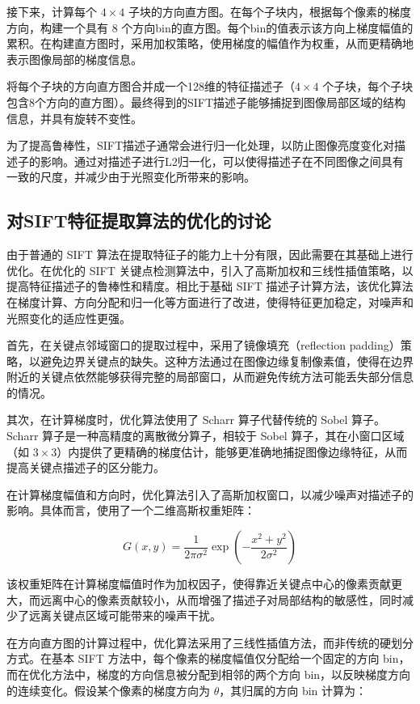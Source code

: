 \documentclass[a4paper, utf8]{ctexart}
\begin{document}
	接下来，计算每个 $4 \times 4$ 子块的方向直方图。在每个子块内，根据每个像素的梯度方向，构建一个具有 $8$ 个方向bin的直方图。每个bin的值表示该方向上梯度幅值的累积。在构建直方图时，采用加权策略，使用梯度的幅值作为权重，从而更精确地表示图像局部的梯度信息。
	
	将每个子块的方向直方图合并成一个128维的特征描述子（$4 \times 4$ 个子块，每个子块包含8个方向的直方图）。最终得到的SIFT描述子能够捕捉到图像局部区域的结构信息，并具有旋转不变性。
	
	为了提高鲁棒性，SIFT描述子通常会进行归一化处理，以防止图像亮度变化对描述子的影响。通过对描述子进行L2归一化，可以使得描述子在不同图像之间具有一致的尺度，并减少由于光照变化所带来的影响。
	
	\subsection{对SIFT特征提取算法的优化的讨论}
	
	由于普通的 SIFT 算法在提取特征子的能力上十分有限，因此需要在其基础上进行优化。在优化的 SIFT 关键点检测算法中，引入了高斯加权和三线性插值策略，以提高特征描述子的鲁棒性和精度。相比于基础 SIFT 描述子计算方法，该优化算法在梯度计算、方向分配和归一化等方面进行了改进，使得特征更加稳定，对噪声和光照变化的适应性更强。
	
	首先，在关键点邻域窗口的提取过程中，采用了镜像填充（reflection padding）策略，以避免边界关键点的缺失。这种方法通过在图像边缘复制像素值，使得在边界附近的关键点依然能够获得完整的局部窗口，从而避免传统方法可能丢失部分信息的情况。
	
	其次，在计算梯度时，优化算法使用了 Scharr 算子代替传统的 Sobel 算子。Scharr 算子是一种高精度的离散微分算子，相较于 Sobel 算子，其在小窗口区域（如 $3\times3$）内提供了更精确的梯度估计，能够更准确地捕捉图像边缘特征，从而提高关键点描述子的区分能力。
	
	在计算梯度幅值和方向时，优化算法引入了高斯加权窗口，以减少噪声对描述子的影响。具体而言，使用了一个二维高斯权重矩阵：
	
	\vspace{-.5em}
	\begin{equation}
	G(x, y) = \frac{1}{2\pi\sigma^2} \exp \left(-\frac{x^2 + y^2}{2\sigma^2} \right)
	\end{equation}
	
	该权重矩阵在计算梯度幅值时作为加权因子，使得靠近关键点中心的像素贡献更大，而远离中心的像素贡献较小，从而增强了描述子对局部结构的敏感性，同时减少了远离关键点区域可能带来的噪声干扰。
	
	在方向直方图的计算过程中，优化算法采用了三线性插值方法，而非传统的硬划分方式。在基本 SIFT 方法中，每个像素的梯度幅值仅分配给一个固定的方向 bin，而在优化方法中，梯度的方向信息被分配到相邻的两个方向 bin，以反映梯度方向的连续变化。假设某个像素的梯度方向为 $\theta$，其归属的方向 bin 计算为：
	
\end{document}
